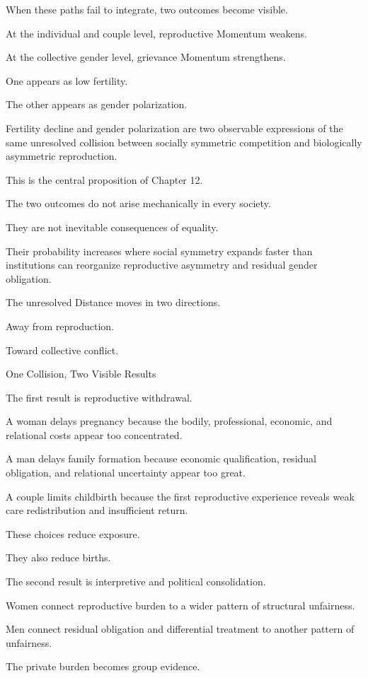 When these paths fail to integrate, two outcomes become visible.

At the individual and couple level, reproductive Momentum weakens.

At the collective gender level, grievance Momentum strengthens.

One appears as low fertility.

The other appears as gender polarization.

Fertility decline and gender polarization are two observable expressions of the same unresolved collision between socially symmetric competition and biologically asymmetric reproduction.

This is the central proposition of Chapter 12.

The two outcomes do not arise mechanically in every society.

They are not inevitable consequences of equality.

Their probability increases where social symmetry expands faster than institutions can reorganize reproductive asymmetry and residual gender obligation.

The unresolved Distance moves in two directions.

Away from reproduction.

Toward collective conflict.

One Collision, Two Visible Results

The first result is reproductive withdrawal.

A woman delays pregnancy because the bodily, professional, economic, and relational costs appear too concentrated.

A man delays family formation because economic qualification, residual obligation, and relational uncertainty appear too great.

A couple limits childbirth because the first reproductive experience reveals weak care redistribution and insufficient return.

These choices reduce exposure.

They also reduce births.

The second result is interpretive and political consolidation.

Women connect reproductive burden to a wider pattern of structural unfairness.

Men connect residual obligation and differential treatment to another pattern of unfairness.

The private burden becomes group evidence.


